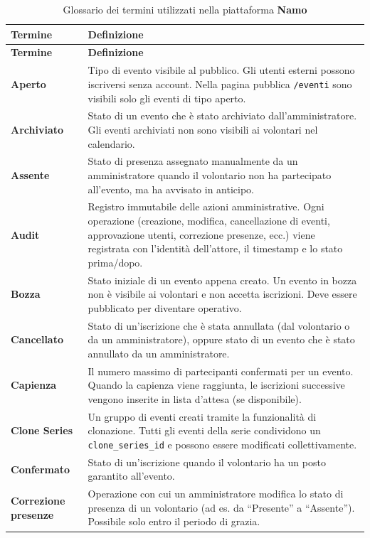\documentclass[a4paper,11pt,oneside]{book}
\newcommand{\namo}{\textbf{Namo}}
\newcommand{\campo}[1]{\texttt{#1}}
\newcommand{\percorso}[1]{\textcolor{namoCyan}{\texttt{#1}}}
\begin{document}
\begin{longtable}{l p{10cm}}
\caption{Glossario dei termini utilizzati nella piattaforma \namo{}} \label{tab:glossario} \\
\toprule
\textbf{Termine} & \textbf{Definizione} \\
\midrule
\endfirsthead
\toprule
\textbf{Termine} & \textbf{Definizione} \\
\midrule
\endhead
\textbf{Aperto} & Tipo di evento visibile al pubblico. Gli utenti esterni possono iscriversi senza account. Nella pagina pubblica \percorso{/eventi} sono visibili solo gli eventi di tipo aperto. \\[4pt]
\textbf{Archiviato} & Stato di un evento che \`e stato archiviato dall'amministratore. Gli eventi archiviati non sono visibili ai volontari nel calendario. \\[4pt]
\textbf{Assente} & Stato di presenza assegnato manualmente da un amministratore quando il volontario non ha partecipato all'evento, ma ha avvisato in anticipo. \\[4pt]
\textbf{Audit} & Registro immutabile delle azioni amministrative. Ogni operazione (creazione, modifica, cancellazione di eventi, approvazione utenti, correzione presenze, ecc.) viene registrata con l'identit\`a dell'attore, il timestamp e lo stato prima/dopo. \\[4pt]
\textbf{Bozza} & Stato iniziale di un evento appena creato. Un evento in bozza non \`e visibile ai volontari e non accetta iscrizioni. Deve essere pubblicato per diventare operativo. \\[4pt]
\textbf{Cancellato} & Stato di un'iscrizione che \`e stata annullata (dal volontario o da un amministratore), oppure stato di un evento che \`e stato annullato da un amministratore. \\[4pt]
\textbf{Capienza} & Il numero massimo di partecipanti confermati per un evento. Quando la capienza viene raggiunta, le iscrizioni successive vengono inserite in lista d'attesa (se disponibile). \\[4pt]
\textbf{Clone Series} & Un gruppo di eventi creati tramite la funzionalit\`a di clonazione. Tutti gli eventi della serie condividono un \campo{clone\_series\_id} e possono essere modificati collettivamente. \\[4pt]
\textbf{Confermato} & Stato di un'iscrizione quando il volontario ha un posto garantito all'evento. \\[4pt]
\textbf{Correzione presenze} & Operazione con cui un amministratore modifica lo stato di presenza di un volontario (ad es. da ``Presente'' a ``Assente''). Possibile solo entro il periodo di grazia. \\[4pt]

\end{longtable}
\end{document}
